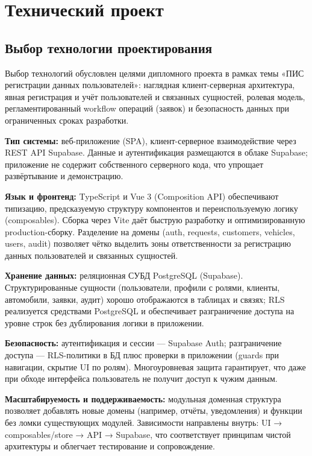 \section{Технический проект}
\subsection{Выбор технологии проектирования}

Выбор технологий обусловлен целями дипломного проекта в рамках темы «ПИС регистрации данных пользователей»: наглядная клиент-серверная архитектура, явная регистрация и учёт пользователей и связанных сущностей, ролевая модель, регламентированный workflow операций (заявок) и безопасность данных при ограниченных сроках разработки.

\textbf{Тип системы:} веб-приложение (SPA), клиент-серверное взаимодействие через REST API Supabase. Данные и аутентификация размещаются в облаке Supabase; приложение не содержит собственного серверного кода, что упрощает развёртывание и демонстрацию.

\textbf{Язык и фронтенд:} TypeScript и Vue 3 (Composition API) обеспечивают типизацию, предсказуемую структуру компонентов и переиспользуемую логику (composables). Сборка через Vite даёт быструю разработку и оптимизированную production-сборку. Разделение на домены (auth, requests, customers, vehicles, users, audit) позволяет чётко выделить зоны ответственности за регистрацию данных пользователей и связанных сущностей.

\textbf{Хранение данных:} реляционная СУБД PostgreSQL (Supabase). Структурированные сущности (пользователи, профили с ролями, клиенты, автомобили, заявки, аудит) хорошо отображаются в таблицах и связях; RLS реализуется средствами PostgreSQL и обеспечивает разграничение доступа на уровне строк без дублирования логики в приложении.

\textbf{Безопасность:} аутентификация и сессии — Supabase Auth; разграничение доступа — RLS-политики в БД плюс проверки в приложении (guards при навигации, скрытие UI по ролям). Многоуровневая защита гарантирует, что даже при обходе интерфейса пользователь не получит доступ к чужим данным.

\textbf{Масштабируемость и поддерживаемость:} модульная доменная структура позволяет добавлять новые домены (например, отчёты, уведомления) и функции без ломки существующих модулей. Зависимости направлены внутрь: UI → composables/store → API → Supabase, что соответствует принципам чистой архитектуры и облегчает тестирование и сопровождение.

